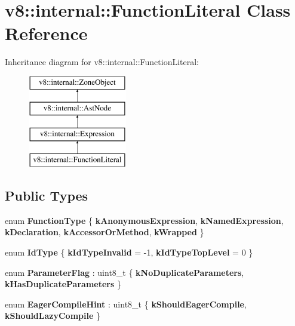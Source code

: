 \hypertarget{classv8_1_1internal_1_1FunctionLiteral}{}\section{v8\+:\+:internal\+:\+:Function\+Literal Class Reference}
\label{classv8_1_1internal_1_1FunctionLiteral}
Inheritance diagram for v8\+:\+:internal\+:\+:Function\+Literal\+:\begin{figure}[H]
\begin{center}
\leavevmode
\includegraphics[height=4.000000cm]{classv8_1_1internal_1_1FunctionLiteral}
\end{center}
\end{figure}
\subsection*{Public Types}
\begin{DoxyCompactItemize}
\item 
\mbox{\label{classv8_1_1internal_1_1FunctionLiteral_a8886eb91113bf0a173f28930847f8709}} 
enum {\bfseries Function\+Type} \{ \newline
{\bfseries k\+Anonymous\+Expression}, 
{\bfseries k\+Named\+Expression}, 
{\bfseries k\+Declaration}, 
{\bfseries k\+Accessor\+Or\+Method}, 
\newline
{\bfseries k\+Wrapped}
 \}
\item 
\mbox{\label{classv8_1_1internal_1_1FunctionLiteral_a62a06abc664217bd65f039f3fc7aa5c4}} 
enum {\bfseries Id\+Type} \{ {\bfseries k\+Id\+Type\+Invalid} = -\/1, 
{\bfseries k\+Id\+Type\+Top\+Level} = 0
 \}
\item 
\mbox{\label{classv8_1_1internal_1_1FunctionLiteral_a5284629ea529d40edd36090d9032a6c4}} 
enum {\bfseries Parameter\+Flag} \+: uint8\+\_\+t \{ {\bfseries k\+No\+Duplicate\+Parameters}, 
{\bfseries k\+Has\+Duplicate\+Parameters}
 \}
\item 
\mbox{\label{classv8_1_1internal_1_1FunctionLiteral_a88aceb776d91034844bee9a78b28a236}} 
enum {\bfseries Eager\+Compile\+Hint} \+: uint8\+\_\+t \{ {\bfseries k\+Should\+Eager\+Compile}, 
{\bfseries k\+Should\+Lazy\+Compile}
 \}
\end{DoxyCompactItemize}
